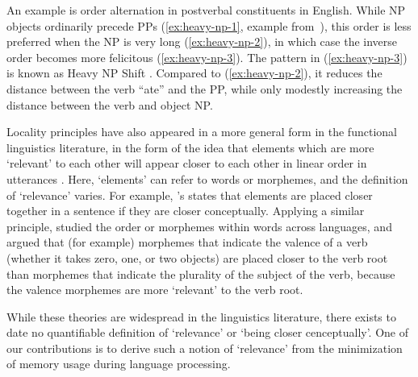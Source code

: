 An example is order alternation in postverbal constituents in English.
While NP objects ordinarily precede PPs (\ref{ex:heavy-np-1}, example from~\citet{staub2006heavy}), this order is less preferred when the NP is very long (\ref{ex:heavy-np-2}), in which case the inverse order becomes more felicitous (\ref{ex:heavy-np-3}).
The pattern in (\ref{ex:heavy-np-3}) is known as Heavy NP Shift \citep{ross1967constraints,arnold2000heaviness,stallings2011s}.
Compared to (\ref{ex:heavy-np-2}), it reduces the distance between the verb ``ate'' and the PP, while only modestly increasing the distance between the verb and object NP.


Locality principles have also appeared in a more general form in the functional linguistics literature, in the form of the idea that elements which are more `relevant' to each other will appear closer to each other in linear order in utterances \citep{behaghel1932deutsche,givon1985iconicity,givon1991markedness,bybee-morphology-1985,newmeyer1992iconicity}. Here, `elements' can refer to words or morphemes, and the definition of `relevance' varies. For example, \citet{givon1985iconicity}'s  states that elements are placed closer together in a sentence if they are closer conceptually.
Applying a similar principle, \citet{bybee-morphology-1985} studied the order or morphemes within words across languages, and argued that (for example) morphemes that indicate the valence of a verb (whether it takes zero, one, or two objects) are placed closer to the verb root than morphemes that indicate the plurality of the subject of the verb, because the valence morphemes are more `relevant' to the verb root. %

While these theories are widespread in the linguistics literature, there exists to date no quantifiable definition of `relevance' or `being closer cenceptually'. One of our contributions is to derive such a notion of `relevance' from the minimization of memory usage during language processing.


